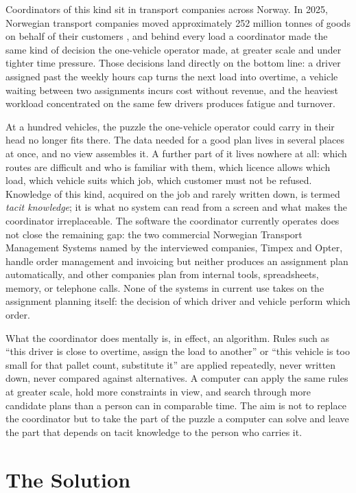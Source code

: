 Coordinators of this kind sit in transport companies across Norway. In 2025, Norwegian transport companies moved approximately 252 million tonnes of goods on behalf of their customers \parencite{ssb2026godstransport}, and behind every load a coordinator made the same kind of decision the one-vehicle operator made, at greater scale and under tighter time pressure. Those decisions land directly on the bottom line: a driver assigned past the weekly hours cap turns the next load into overtime, a vehicle waiting between two assignments incurs cost without revenue, and the heaviest workload concentrated on the same few drivers produces fatigue and turnover.

At a hundred vehicles, the puzzle the one-vehicle operator could carry in their head no longer fits there. The data needed for a good plan lives in several places at once, and no view assembles it. A further part of it lives nowhere at all: which routes are difficult and who is familiar with them, which licence allows which load, which vehicle suits which job, which customer must not be refused. Knowledge of this kind, acquired on the job and rarely written down, is termed \emph{tacit knowledge}; it is what no system can read from a screen and what makes the coordinator irreplaceable. The software the coordinator currently operates does not close the remaining gap: the two commercial Norwegian Transport Management Systems named by the interviewed companies, Timpex and Opter, handle order management and invoicing but neither produces an assignment plan automatically, and other companies plan from internal tools, spreadsheets, memory, or telephone calls. None of the systems in current use takes on the assignment planning itself: the decision of which driver and vehicle perform which order.

What the coordinator does mentally is, in effect, an algorithm. Rules such as ``this driver is close to overtime, assign the load to another'' or ``this vehicle is too small for that pallet count, substitute it'' are applied repeatedly, never written down, never compared against alternatives. A computer can apply the same rules at greater scale, hold more constraints in view, and search through more candidate plans than a person can in comparable time. The aim is not to replace the coordinator but to take the part of the puzzle a computer can solve and leave the part that depends on tacit knowledge to the person who carries it.


\section{The Solution}
\label{sec:solution}

